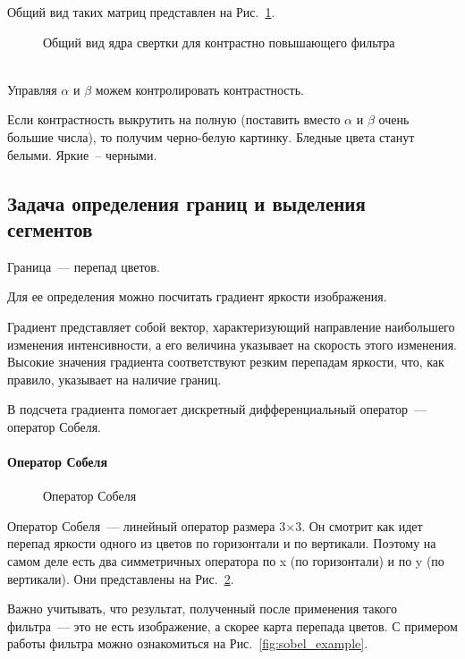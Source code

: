 Общий вид таких матриц представлен на Рис.~\ref{fig:sharpen_general_view}.
\\
\begin{figure}[h]
    \centering
    
    \caption{Общий вид ядра свертки для контрастно повышающего фильтра}
    \label{fig:sharpen_general_view}
\end{figure}
\\

Управляя $\alpha$ и $\beta$ можем контролировать контрастность.

Если контрастность выкрутить на полную (поставить вместо $\alpha$ и $\beta$ очень большие числа), то получим черно-белую картинку.
Бледные цвета станут белыми. Яркие~-- черными.

\subsection{Задача определения границ и выделения сегментов}

Граница~--- перепад цветов.

Для ее определения можно посчитать градиент яркости изображения.

Градиент представляет собой вектор, характеризующий направление наибольшего изменения интенсивности, а его величина указывает на скорость этого изменения. Высокие значения градиента соответствуют резким перепадам яркости, что, как правило, указывает на наличие границ.

В подсчета градиента помогает дискретный дифференциальный оператор~--- оператор Собеля.
\paragraph{Оператор Собеля}

\begin{figure}[h]
    \centering
    
    \caption{Оператор Собеля}
    \label{fig:sobel}
\end{figure}

Оператор Собеля~--- линейный оператор размера 3$\times$3. Он смотрит как идет перепад яркости одного из цветов по горизонтали и по вертикали. Поэтому на самом деле есть два симметричных оператора по x (по горизонтали) и по y (по вертикали). Они представлены на Рис.~\ref{fig:sobel}.

Важно учитывать, что результат, полученный после применения такого фильтра~--- это не есть изображение, а скорее карта перепада цветов. С примером работы фильтра можно ознакомиться на Рис.~\ref{fig:sobel_example}.

